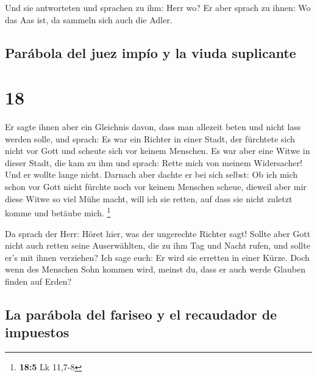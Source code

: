  Und sie antworteten und sprachen zu ihm: Herr wo? Er
aber sprach zu ihnen: Wo das Aas ist, da sammeln sich auch die Adler.

\hypertarget{paruxe1bola-del-juez-impuxedo-y-la-viuda-suplicante}{%
\subsection{Parábola del juez impío y la viuda
suplicante}\label{paruxe1bola-del-juez-impuxedo-y-la-viuda-suplicante}}

\hypertarget{section-17}{%
\section{18}\label{section-17}}

 Er sagte ihnen aber ein Gleichnis davon, dass man
allezeit beten und nicht lass werden solle,  und sprach:
Es war ein Richter in einer Stadt, der fürchtete sich nicht vor Gott und
scheute sich vor keinem Menschen.  Es war aber eine Witwe
in dieser Stadt, die kam zu ihm und sprach: Rette mich von meinem
Widersacher!  Und er wollte lange nicht. Darnach aber
dachte er bei sich selbst: Ob ich mich schon vor Gott nicht fürchte noch
vor keinem Menschen scheue,  dieweil aber mir diese Witwe
so viel Mühe macht, will ich sie retten, auf dass sie nicht zuletzt
komme und betäube mich. \footnote{\textbf{18:5} Lk 11,7-8}

 Da sprach der Herr: Höret hier, was der ungerechte
Richter sagt!  Sollte aber Gott nicht auch retten seine
Auserwählten, die zu ihm Tag und Nacht rufen, und sollte er's mit ihnen
verziehen?  Ich sage euch: Er wird sie erretten in einer
Kürze. Doch wenn des Menschen Sohn kommen wird, meinst du, dass er auch
werde Glauben finden auf Erden?

\hypertarget{la-paruxe1bola-del-fariseo-y-el-recaudador-de-impuestos}{%
\subsection{La parábola del fariseo y el recaudador de
impuestos}\label{la-paruxe1bola-del-fariseo-y-el-recaudador-de-impuestos}}

